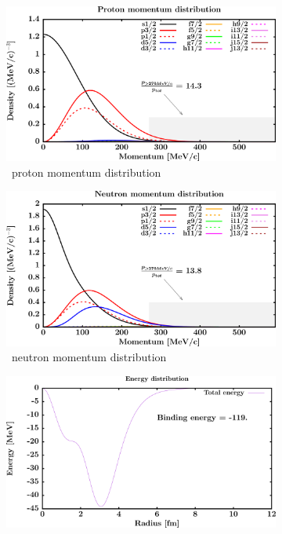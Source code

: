 \begin{figure}[hbtp]
    \captionsetup[subfigure]{labelformat=empty}
    \centering
    \begin{subfigure}[b]{0.45\textwidth}
        \centering
        \includegraphics[width=\linewidth]{figures/o18_protonLJMomentumDist.png}
        \caption{\oEight\ proton momentum distribution}
        \label{DOMFitData_o18_proton_momentumDist}
    \end{subfigure}\hspace{6pt}
    \begin{subfigure}[b]{0.45\textwidth}
        \centering
        \includegraphics[width=\linewidth]{figures/o18_neutronLJMomentumDist.png}
        \caption{\oEight\ neutron momentum distribution}
        \label{DOMFitData_o18_neutron_momentumDist}
    \end{subfigure}\vspace{0.3in}
    \begin{subfigure}{0.45\textwidth}
        \centering
        \includegraphics[width=\linewidth]{figures/o18_EnergyDist.png}

\end{subfigure}
\end{figure}
